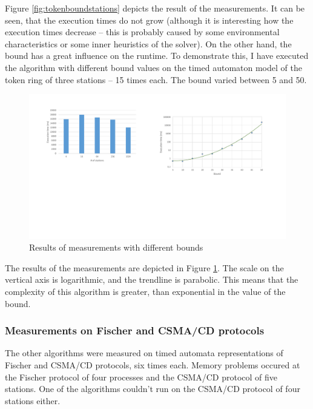 Figure \ref{fig:tokenboundstations} depicts the result of the measurements. It can be seen, that the execution times do not grow (although it is interesting how the execution times decrease -- this is probably caused by some environmental characteristics or some inner heuristics of the solver). On the other hand, the bound has a great influence on the runtime. To demonstrate this, I have executed the algorithm with different bound values on the timed automaton model of the token ring of three stations -- 15 times each. The bound varied between 5 and 50.

\begin{figure}
	\centering
	\includegraphics[width=\textwidth]{include/figures/diag_bound}
	\caption{Results of measurements with different bounds}
	\label{fig:tokenbound}
\end{figure}

The results of the measurements are depicted in Figure \ref{fig:tokenbound}. The scale on the vertical axis is logarithmic, and the trendline is parabolic. This means that the complexity of this algorithm is greater, than exponential in the value of the bound.

\subsubsection{Measurements on Fischer and CSMA/CD protocols}

The other algorithms were measured on timed automata representations of Fischer and CSMA/CD protocols, six times each. Memory problems occured at the Fischer protocol of four processes and the CSMA/CD protocol of five stations. One of the algorithms couldn't run on the CSMA/CD protocol of four stations either.

